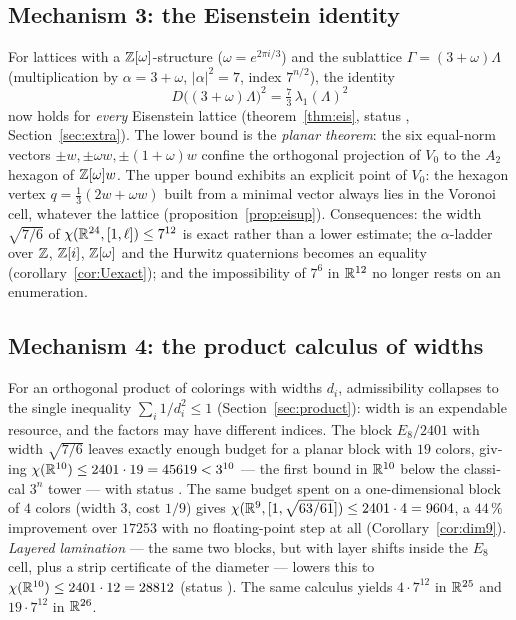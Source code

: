 \begin{otherlanguage}{english}
\subsection*{Mechanism 3: the Eisenstein identity}

For lattices with a $\mathbb{Z}[\omega]$-structure ($\omega=e^{2\pi i/3}$) and the
sublattice $\Gamma=(3+\omega)\Lambda$ (multiplication by $\alpha=3+\omega$,
$|\alpha|^2=7$, index $7^{n/2}$), the identity
\[
D\bigl((3+\omega)\Lambda\bigr)^2=\tfrac73\,\lambda_1(\Lambda)^2
\]
now holds for \emph{every} Eisenstein lattice (theorem~\ref{thm:eis}, status
\stP, Section~\ref{sec:extra}). The lower bound is the \emph{planar theorem}:
the six equal-norm vectors $\pm w,\pm\omega w,\pm(1+\omega)w$ confine the
orthogonal projection of $V_0$ to the $A_2$ hexagon of $\mathbb{Z}[\omega]w$. The upper
bound exhibits an explicit point of $V_0$: the hexagon vertex
$q=\frac13(2w+\omega w)$ built from a minimal vector always lies in the
Voronoi cell, whatever the lattice (proposition~\ref{prop:eisup}).
Consequences: the width $\sqrt{7/6}$ of
$\chi(\mathbb{R}^{24},[1,\ell])\le7^{12}$ is exact rather than a lower estimate; the
$\alpha$-ladder over $\mathbb{Z}$, $\mathbb{Z}[i]$, $\mathbb{Z}[\omega]$ and the Hurwitz quaternions
becomes an equality (corollary~\ref{cor:Uexact}); and the impossibility of
$7^6$ in $\mathbb{R}^{12}$ no longer rests on an enumeration.

\subsection*{Mechanism 4: the product calculus of widths}

For an orthogonal product of colorings with widths $d_i$, admissibility
collapses to the single inequality $\sum_i 1/d_i^2\le1$
(Section~\ref{sec:product}): width is an expendable resource, and the
factors may have different indices. The block $E_8/2401$ with width
$\sqrt{7/6}$ leaves exactly enough budget for a planar block with $19$
colors, giving $\chi(\mathbb{R}^{10})\le2401\cdot19=45619<3^{10}$ --- the first
bound in $\mathbb{R}^{10}$ below the classical $3^n$ tower --- with status \stP.
The same budget spent on a one-dimensional block of $4$ colors (width $3$,
cost $1/9$) gives $\chi(\mathbb{R}^9,[1,\sqrt{63/61}])\le2401\cdot4=9604$, a
$44\,\%$ improvement over $17253$ with no floating-point step at all
(Corollary~\ref{cor:dim9}).
\emph{Layered lamination} --- the same two blocks, but with layer shifts
inside the $E_8$ cell, plus a strip certificate of the diameter --- lowers
this to $\chi(\mathbb{R}^{10})\le2401\cdot12=28812$ (status \stN). The same
calculus yields $4\cdot7^{12}$ in $\mathbb{R}^{25}$ and $19\cdot7^{12}$ in
$\mathbb{R}^{26}$.


\end{otherlanguage}
